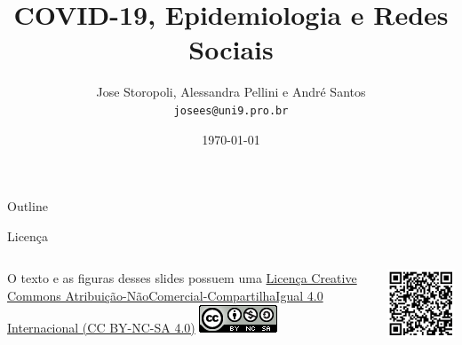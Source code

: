 \documentclass[aspectratio=169]{beamer}                    %
\title[COVID-19, Epidemiologia e Redes Sociais]{COVID-19, Epidemiologia e Redes Sociais}
\author{Jose Storopoli, Alessandra Pellini e André Santos \\
\texttt{josees@uni9.pro.br}}
\institute{Universidade Nove de Julho - UNINOVE}
\date{\today}
\begin{document}
\maketitle

\begin{frame}{Outline}
    \tableofcontents
\end{frame}

\begin{frame}{Licença}
    \begin{columns}
        \begin{column}{0.5\textwidth}
            O texto e as figuras desses slides possuem uma
            \href{https://creativecommons.org/licenses/by-nc-sa/4.0/deed.pt}{Licença
            Creative Commons
            Atribuição-NãoComercial-CompartilhaIgual 4.0 Internacional (CC BY-NC-SA 4.0)}
            \vfill
            \centering
            \vspace{1em}
            \includegraphics[width=0.2\columnwidth]{CC_NC_SA.png}
        \end{column}
        \begin{column}{0.5\textwidth}
            \centering
            \includegraphics[width=0.8\columnwidth]{QR_Code.png}
        \end{column}
    \end{columns}
    \vfill
\end{frame}
\end{document}

